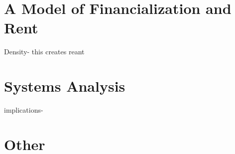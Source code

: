 \documentclass[dvipsnames,letterpaper,12pt,titlepage,oneside,final]{memoir}
\begin{document}
\tableofcontents






\part{A Model of Financialization and Rent}
Density- this creates reant

\part{Systems Analysis}



implications- 

\part{Other}




% 
% 
% 
% 



% 
\end{document}

